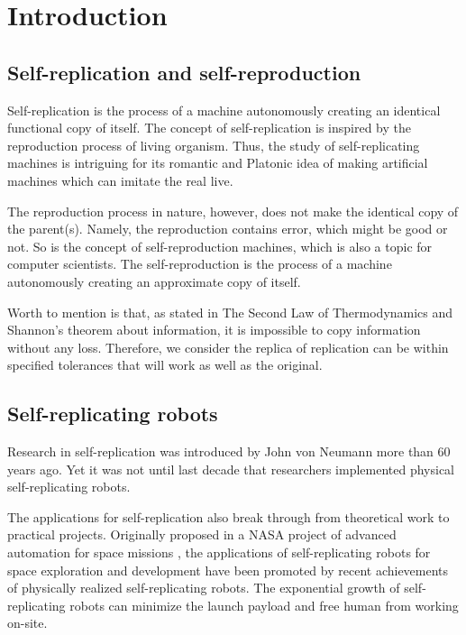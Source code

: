\documentclass[12pt,twoside]{article}
\theoremstyle{plain}
\theoremstyle{definition}
\theoremstyle{remark}
\begin{document}
\tableofcontents
{}
\clearpage



\section{Introduction}
\label{sec:intro}

\subsection{Self-replication and self-reproduction}
Self-replication is the process of a machine autonomously creating an identical functional copy of itself. The concept of self-replication is inspired by the reproduction process of living organism. Thus, the study of self-replicating machines is intriguing for its romantic and Platonic idea of making artificial machines which can imitate the real live.

The reproduction process in nature, however, does not make the identical copy of the parent(s). Namely, the reproduction contains error, which might be good or not. So is the concept of self-reproduction machines, which is also a topic for computer scientists. The self-reproduction is the process of a machine autonomously creating an approximate copy of itself.

Worth to mention is that, as stated in The Second Law of Thermodynamics and Shannon's theorem about information, it is impossible to copy information without any loss. Therefore, we consider the replica of replication can be within specified tolerances that
will work as well as the original\cite{jones_reprap_2011}.

\subsection{Self-replicating robots}
Research in self-replication was introduced by John von Neumann\cite{von_neumann_theory_1962} more than 60 years ago. Yet it was not until last decade that researchers implemented physical self-replicating robots\cite{suthakorn_autonomous_2003}. 

The applications for self-replication also break through from theoretical work to practical projects. Originally proposed in a NASA project of advanced automation for space missions \cite{freitas_report_1981}, the applications of self-replicating robots for space exploration and development have been promoted by recent achievements of physically realized self-replicating robots\cite{chirikjian_self-replicating_2002}. The exponential growth of self-replicating robots can minimize the launch payload and free human from working on-site.
\end{document}
